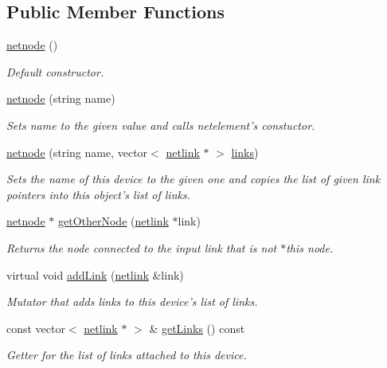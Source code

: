 \subsection*{Public Member Functions}
\begin{DoxyCompactItemize}
\item 
\hyperlink{classnetnode_ad0f9b3efbaa334595b62486d6dd419cf}{netnode} ()
\begin{DoxyCompactList}\small\item\em Default constructor. \end{DoxyCompactList}\item 
\hyperlink{classnetnode_a32eddc0b4bee9b523a6bffda4ef921ea}{netnode} (string name)
\begin{DoxyCompactList}\small\item\em Sets name to the given value and calls netelement's constuctor. \end{DoxyCompactList}\item 
\hyperlink{classnetnode_a8cf0f8e17de9aad66998a184adf96621}{netnode} (string name, vector$<$ \hyperlink{classnetlink}{netlink} $\ast$ $>$ \hyperlink{classnetnode_af481c4109393b79170f523ca92bea507}{links})
\begin{DoxyCompactList}\small\item\em Sets the name of this device to the given one and copies the list of given link pointers into this object's list of links. \end{DoxyCompactList}\item 
\hyperlink{classnetnode}{netnode} $\ast$ \hyperlink{classnetnode_a0af8d29fc1c1979fec8af2831e2bcc82}{get\-Other\-Node} (\hyperlink{classnetlink}{netlink} $\ast$link)
\begin{DoxyCompactList}\small\item\em Returns the node connected to the input link that is not $\ast$this node. \end{DoxyCompactList}\item 
virtual void \hyperlink{classnetnode_a4faaedd2e9121270a220eb67004dba7c}{add\-Link} (\hyperlink{classnetlink}{netlink} \&link)
\begin{DoxyCompactList}\small\item\em Mutator that adds links to this device's list of links. \end{DoxyCompactList}\item 
const vector$<$ \hyperlink{classnetlink}{netlink} $\ast$ $>$ \& \hyperlink{classnetnode_a0299d9b8d9bd8b12ea644fcd04359d1a}{get\-Links} () const 
\begin{DoxyCompactList}\small\item\em Getter for the list of links attached to this device. \end{DoxyCompactList}\item 

\end{DoxyCompactItemize}
